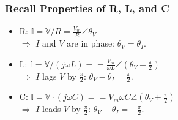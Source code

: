 \documentclass{beamer}
\begin{document}

\begin{frame}[fragile]
\frametitle{Recall Properties of R, L, and C}

\vspace{-1cm}

\begin{itemize}
\item R: $\mathbb{I} =\mathbb{V}/R = \frac{V_m}{R} \angle \theta_V$ 
\\
$\Rightarrow$ $I$ and $V$ are in phase: $\theta_V = \theta_I$.
\item L: $\mathbb{I} = \mathbb{V}/(j \omega L) = = \frac{V_m}{\omega L} \angle (\theta_V - \frac{\pi}{2})$ 
\\
$\Rightarrow$ $I$ lags $V$ by $\frac{\pi}{2}$: $\theta_V - \theta_I = \frac{\pi}{2}$.
\item C: $\mathbb{I} = \mathbb{V} \cdot (j \omega C) = = V_m \omega C \angle (\theta_V + \frac{\pi}{2})$ 
\\
$\Rightarrow$ $I$ leads $V$ by $\frac{\pi}{2}$: $\theta_V - \theta_I = -\frac{\pi}{2}$.
\end{itemize}

\end{frame}

\end{document}
